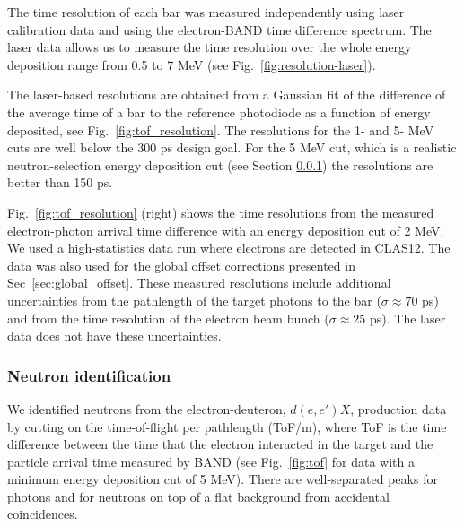 \documentclass[3p,final,twocolumn]{elsarticle}
\begin{document}
\setcounter{footnote}{2} 
The time resolution of each bar was measured
independently using laser calibration data and using the electron-BAND
time difference spectrum. The laser data allows us to measure the time
resolution over the whole energy deposition range from 0.5 to 7 \si{\mega\electronvolt}  (see
Fig.~\ref{fig:resolution-laser}).

The laser-based resolutions are obtained from a Gaussian fit of the difference of
the average time of a bar to the reference photodiode as a function of energy
deposited, see Fig.~\ref{fig:tof_resolution}. The resolutions for the
1- and 5- \si{\mega\electronvolt} cuts are well below the 300 \si{\pico\s} design goal. For the 5 \si{\mega\electronvolt} cut, which
is a realistic neutron-selection energy deposition cut (see Section
\ref{sec:neutronidentification}) the resolutions are better than 150 \si{\pico\s}.

Fig.~\ref{fig:tof_resolution} (right) shows the time resolutions from
the measured electron-photon arrival time difference with an energy deposition cut of 2 \si{\mega\electronvolt}. We used a high-statistics data run where
electrons are detected in CLAS12. The data was also used for the
global offset corrections presented in Sec~\ref{sec:global_offset}.
These measured resolutions include
additional uncertainties from the pathlength of the target photons
to the bar ($\sigma\approx 70$ \si{\pico\s}) and from the time resolution of the electron beam bunch ($\sigma \approx 25$ \si{\pico\s}). The
laser data does not have these uncertainties.


\subsubsection{Neutron identification}
\label{sec:neutronidentification}
We identified neutrons from the electron-deuteron, $d(e,e')X$,
production data by cutting on the
time-of-flight per pathlength (ToF/m), where ToF is the time difference
between the time that the electron
interacted in the target and the particle arrival time measured by
BAND (see Fig.~\ref{fig:tof} for data with a minimum energy deposition
cut of 5 \si{\MeV}). There are well-separated peaks for
photons and for neutrons on top of a flat background from accidental coincidences. 
\end{document}
